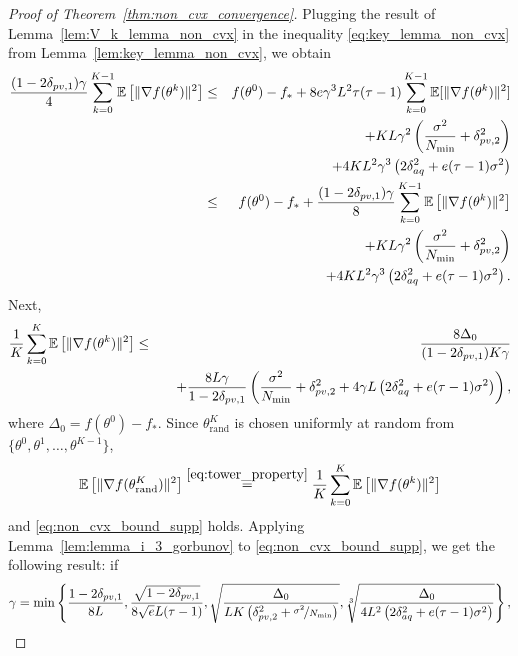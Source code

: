\begin{proof}[Proof of Theorem~\ref{thm:non_cvx_convergence}]
    Plugging the result of Lemma~\ref{lem:V_k_lemma_non_cvx} in the inequality \eqref{eq:key_lemma_non_cvx} from Lemma~\ref{lem:key_lemma_non_cvx}, we obtain
    \begin{eqnarray*}
        \frac{(1-2\delta_{pv,1})\gamma}{4}\sum\limits_{k=0}^{K-1}\mathbb{E}\left[\|\nabla f(\theta^k)\|^2\right] &\le& f(\theta^0) - f_* + 8e\gamma^3L^2\tau(\tau-1)\sum\limits_{k=0}^{K-1}\mathbb{E}[\|\nabla f(\theta^k)\|^2] \\
        &&\quad + KL\gamma^2\left(\frac{\sigma^2}{N_{\min}} + \delta_{pv,2}^2\right)\\
        &&\quad + 4KL^2\gamma^3\left(2\delta_{aq}^2 + e(\tau-1)\sigma^2\right)\\
        &\le& f(\theta^0) - f_* + \frac{(1-2\delta_{pv,1})\gamma}{8}\sum\limits_{k=0}^{K-1}\mathbb{E}\left[\|\nabla f(\theta^k)\|^2\right] \\
         &&\quad + KL\gamma^2\left(\frac{\sigma^2}{N_{\min}} + \delta_{pv,2}^2\right)\\
        &&\quad + 4KL^2\gamma^3\left(2\delta_{aq}^2 + e(\tau-1)\sigma^2\right).
    \end{eqnarray*}
    Next,
    \begin{eqnarray*}
        \frac{1}{K}\sum\limits_{k=0}^K\mathbb{E}\left[\|\nabla f(\theta^k)\|^2\right] &\le& \frac{8\Delta_0}{(1-2\delta_{pv,1})K\gamma} \\
        &&\quad + \frac{8L\gamma}{1-2\delta_{pv,1}}\left(\frac{\sigma^2}{N_{\min}} + \delta_{pv,2}^2 + 4\gamma L\left(2\delta_{aq}^2 + e(\tau-1)\sigma^2\right)\right),
    \end{eqnarray*}
    where $\Delta_0 = f(\theta^0) - f_*$. Since $\theta_{\text{rand}}^K$ is chosen uniformly at random from $\{\theta^0,\theta^1,\ldots,\theta^{K-1}\}$,
    \begin{equation*}
        \mathbb{E}\left[\|\nabla f(\theta_{\text{rand}}^K)\|^2\right] \overset{\eqref{eq:tower_property}}{=} \frac{1}{K}\sum\limits_{k=0}^K\mathbb{E}\left[\|\nabla f(\theta^k)\|^2\right]
    \end{equation*}
    and \eqref{eq:non_cvx_bound_supp} holds. Applying Lemma~\ref{lem:lemma_i_3_gorbunov} to \eqref{eq:non_cvx_bound_supp}, we get the following result: if
    \begin{equation*}
        \gamma = \min\left\{\frac{1-2\delta_{pv,1}}{8L},\frac{\sqrt{1-2\delta_{pv,1}}}{8\sqrt{e}L(\tau-1)}, \sqrt{\frac{\Delta_0}{LK\left(\delta_{pv,2}^2 + \nicefrac{\sigma^2}{N_{\min}}\right)}}, \sqrt[3]{\frac{\Delta_0}{4L^2\left(2\delta_{aq}^2 + e(\tau-1)\sigma^2\right)}}\right\},

\end{equation*}
\end{proof}
